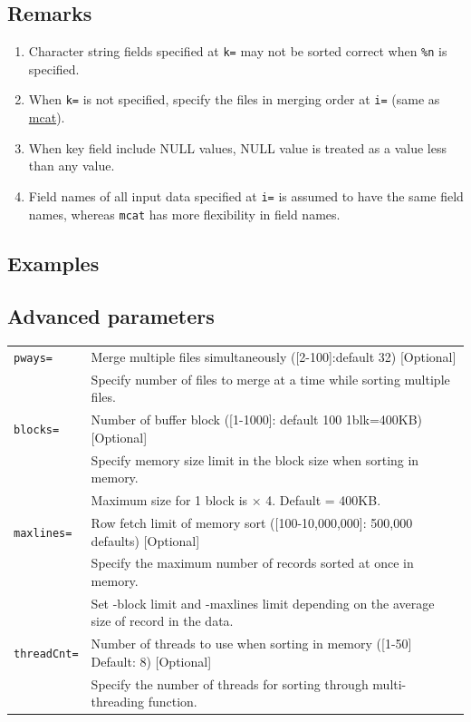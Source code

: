 \subsection*{Remarks}
\begin{enumerate}
\item Character string fields specified at \verb|k=| may not be sorted correct when \verb|%n| is specified. 
\item When \verb|k=| is not specified, specify the files in merging order at \verb|i=| (same as \hyperref[sect:mcat]{mcat}).
\item When key field include NULL values, NULL value is treated as a value less than any value. 
\item Field names of all input data specified at \verb|i=| is assumed to have the same field names, whereas \verb|mcat| has more flexibility in field names. 
\end{enumerate}



\subsection*{Examples}


\subsection*{Advanced parameters}
\begin{table}[htbp]
{\small
\begin{tabular}{ll}
\verb|pways=|    & Merge multiple files simultaneously ([2-100]:default 32) [Optional]\\
                 & Specify  number of files to merge at a time while sorting multiple files. \\
\verb|blocks=|   & Number of buffer block ([1-1000]: default 100 1blk=400KB) [Optional]\\
                 & Specify memory size limit in the block size when sorting in memory.\\
                 & Maximum size for 1 block is × 4. Default = 400KB. \\
\verb|maxlines=| & Row fetch limit of memory sort ([100-10,000,000]: 500,000 defaults) [Optional]\\
                 & Specify the maximum number of records sorted at once in memory.\\
                 & Set -block limit and -maxlines limit depending on the average size of record in the data.\\
\verb|threadCnt=|& Number of threads to use when sorting in memory ([1-50] Default: 8) [Optional]\\
                 & Specify the number of threads for sorting through multi-threading function. \\
\end{tabular} 
}
\end{table} 

